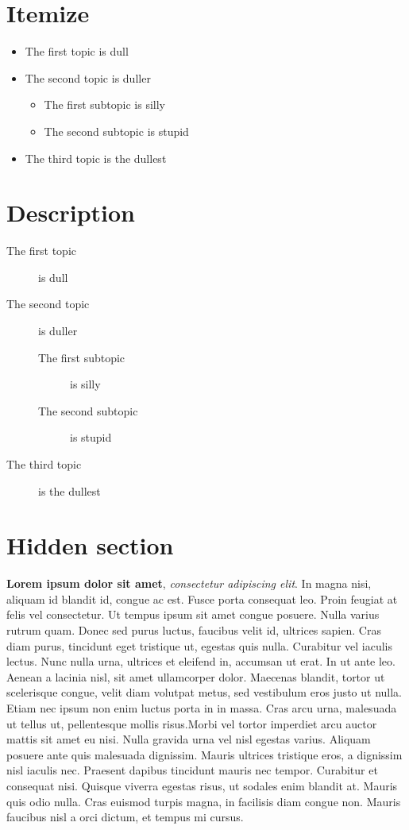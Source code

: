 \section*{Itemize}
\begin{itemize}
\item The first topic is dull
\item The second topic is duller
\begin{itemize}
\item The first subtopic is silly
\item The second subtopic is stupid
\end{itemize}
\item The third topic is the dullest
\end{itemize}

\section*{Description}
\begin{description}
\item[The first topic] is dull
\item[The second topic] is duller
\begin{description}
\item[The first subtopic] is silly
\item[The second subtopic] is stupid
\end{description}
\item[The third topic] is the dullest
\end{description}


\clearpage

\tochide\section{Hidden section}
\textbf{Lorem ipsum dolor sit amet}, \textit{consectetur adipiscing elit}. In magna nisi, aliquam id blandit id, congue ac est. Fusce porta consequat leo. Proin feugiat at felis vel consectetur. Ut tempus ipsum sit amet congue posuere. Nulla varius rutrum quam. Donec sed purus luctus, faucibus velit id, ultrices sapien. Cras diam purus, tincidunt eget tristique ut, egestas quis nulla. Curabitur vel iaculis lectus. Nunc nulla urna, ultrices et eleifend in, accumsan ut erat. In ut ante leo. Aenean a lacinia nisl, sit amet ullamcorper dolor. Maecenas blandit, tortor ut scelerisque congue, velit diam volutpat metus, sed vestibulum eros justo ut nulla. Etiam nec ipsum non enim luctus porta in in massa. Cras arcu urna, malesuada ut tellus ut, pellentesque mollis risus.Morbi vel tortor imperdiet arcu auctor mattis sit amet eu nisi. Nulla gravida urna vel nisl egestas varius. Aliquam posuere ante quis malesuada dignissim. Mauris ultrices tristique eros, a dignissim nisl iaculis nec. Praesent dapibus tincidunt mauris nec tempor. Curabitur et consequat nisi. Quisque viverra egestas risus, ut sodales enim blandit at. Mauris quis odio nulla. Cras euismod turpis magna, in facilisis diam congue non. Mauris faucibus nisl a orci dictum, et tempus mi cursus.

